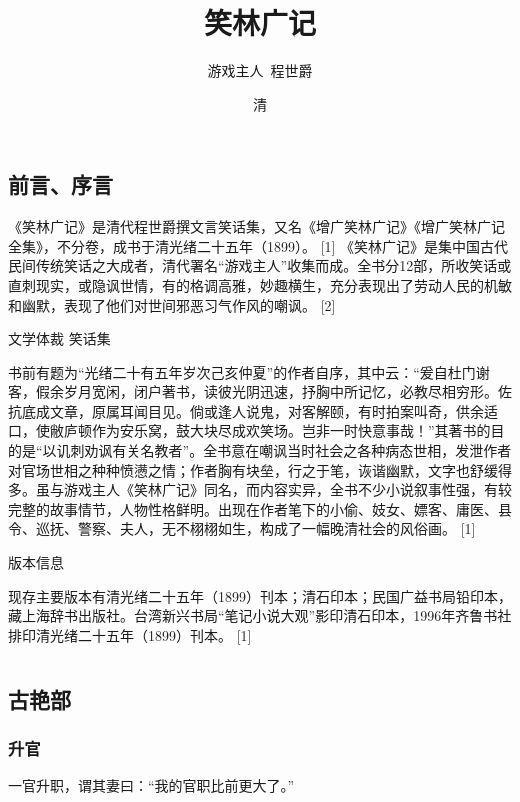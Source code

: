 \documentclass[12pt,UTF8]{ctexbook}
\title{\heiti\zihao{0} 笑林广记}
\author{游戏主人\ 程世爵}
\date{清}
\begin{document}
\maketitle
\tableofcontents

\frontmatter
\chapter{前言、序言}

《笑林广记》是清代程世爵撰文言笑话集，又名《增广笑林广记》《增广笑林广记全集》，不分卷，成书于清光绪二十五年（1899）。 [1]
《笑林广记》是集中国古代民间传统笑话之大成者，清代署名“游戏主人”收集而成。全书分12部，所收笑话或直刺现实，或隐讽世情，有的格调高雅，妙趣横生，充分表现出了劳动人民的机敏和幽默，表现了他们对世间邪恶习气作风的嘲讽。 [2]

文学体裁
笑话集

书前有题为“光绪二十有五年岁次己亥仲夏”的作者自序，其中云：“爰自杜门谢客，假余岁月宽闲，闭户著书，读彼光阴迅速，抒胸中所记忆，必教尽相穷形。佐抗底成文章，原属耳闻目见。倘或逢人说鬼，对客解颐，有时拍案叫奇，供余适口，使敝庐顿作为安乐窝，鼓大块尽成欢笑场。岂非一时快意事哉！”其著书的目的是“以讥刺劝讽有关名教者”。全书意在嘲讽当时社会之各种病态世相，发泄作者对官场世相之种种愤懑之情；作者胸有块垒，行之于笔，诙谐幽默，文字也舒缓得多。虽与游戏主人《笑林广记》同名，而内容实异，全书不少小说叙事性强，有较完整的故事情节，人物性格鲜明。出现在作者笔下的小偷、妓女、嫖客、庸医、县令、巡抚、警察、夫人，无不栩栩如生，构成了一幅晚清社会的风俗画。 [1]

版本信息

现存主要版本有清光绪二十五年（1899）刊本；清石印本；民国广益书局铅印本，藏上海辞书出版社。台湾新兴书局“笔记小说大观”影印清石印本，1996年齐鲁书社排印清光绪二十五年（1899）刊本。 [1]

\mainmatter

\part{}

\chapter{古艳部}

\section{升官}

一官升职，谓其妻曰：“我的官职比前更大了。”
\end{document}
